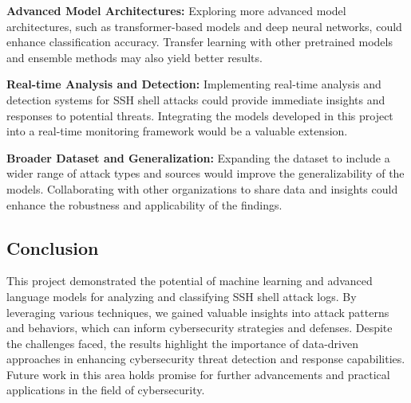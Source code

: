         \textbf{Advanced Model Architectures:} Exploring more advanced model architectures, such as transformer-based models and deep neural networks, could enhance classification accuracy. Transfer learning with other pretrained models and ensemble methods may also yield better results.

        \textbf{Real-time Analysis and Detection:} Implementing real-time analysis and detection systems for SSH shell attacks could provide immediate insights and responses to potential threats. Integrating the models developed in this project into a real-time monitoring framework would be a valuable extension.

        \textbf{Broader Dataset and Generalization:} Expanding the dataset to include a wider range of attack types and sources would improve the generalizability of the models. Collaborating with other organizations to share data and insights could enhance the robustness and applicability of the findings.

    \subsection{Conclusion}
    
        This project demonstrated the potential of machine learning and advanced language models for analyzing and classifying SSH shell attack logs. By leveraging various techniques, we gained valuable insights into attack patterns and behaviors, which can inform cybersecurity strategies and defenses. Despite the challenges faced, the results highlight the importance of data-driven approaches in enhancing cybersecurity threat detection and response capabilities. Future work in this area holds promise for further advancements and practical applications in the field of cybersecurity.
